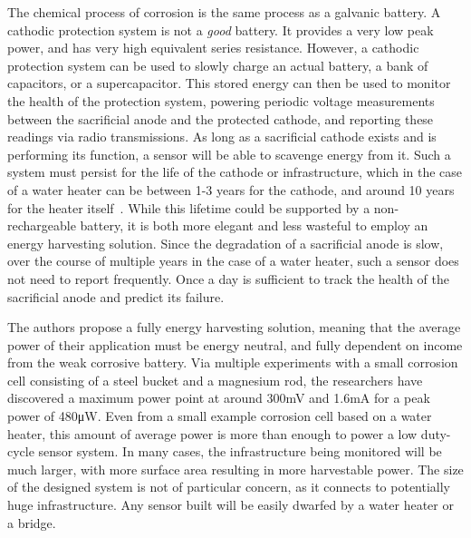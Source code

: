 The chemical process of corrosion is the same process as a galvanic battery. 
A cathodic protection system is not a \textit{good} battery.
It provides a very low peak power, and has very high equivalent series resistance.
However, a cathodic protection system can be used to slowly charge an actual battery, a bank of capacitors, or a supercapacitor. 
This stored energy can then be used to monitor the health of the protection system, powering periodic voltage measurements between the sacrificial anode and the protected cathode, and reporting these readings via radio transmissions. 
As long as a sacrificial cathode exists and is performing its function, a sensor will be able to scavenge energy from it.
Such a system must persist for the life of the cathode or infrastructure, which in the case of a water heater can be between 1-3 years for the cathode, and around 10 years for the heater itself~\cite{jagtap2021repurposing}.
While this lifetime could be supported by a non-rechargeable battery, it is both more elegant and less wasteful to employ an energy harvesting solution.
Since the degradation of a sacrificial anode is slow, over the course of multiple years in the case of a water heater, such a sensor does not need to report frequently.
Once a day is sufficient to track the health of the sacrificial anode and predict its failure.

The authors propose a fully energy harvesting solution, meaning that the average power of their application must be energy neutral, and fully dependent on income from the weak corrosive battery.
Via multiple experiments with a small corrosion cell consisting of a steel bucket and a magnesium rod, the researchers have discovered a maximum power point at around 300\si{\milli\volt} and 1.6\si{\milli\ampere} for a peak power of 480\si{\micro\watt}.
Even from a small example corrosion cell based on a water heater, this amount of average power is more than enough to power a low duty-cycle sensor system.
In many cases, the infrastructure being monitored will be much larger, with more surface area resulting in more harvestable power.
The size of the designed system is not of particular concern, as it connects to potentially huge infrastructure.
Any sensor built will be easily dwarfed by a water heater or a bridge.

